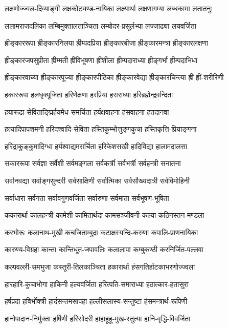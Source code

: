 \twolineshloka
{लक्षणोज्ज्वल-दिव्याङ्गी लक्षकोट्यण्ड-नायिका}
{लक्ष्यार्था लक्षणागम्या लब्धकामा लतातनुः}

\twolineshloka
{ललामराजदलिका लम्बिमुक्तालताञ्चिता}
{लम्बोदर-प्रसूर्लभ्या लज्जाढ्या लयवर्जिता}

\twolineshloka
{ह्रीङ्काररूपा ह्रीङ्कारनिलया ह्रीम्पदप्रिया}
{ह्रीङ्कारबीजा ह्रीङ्कारमन्त्रा ह्रीङ्कारलक्षणा}

\twolineshloka
{ह्रीङ्कारजपसुप्रीता ह्रीम्मती ह्रींविभूषणा}
{ह्रींशीला ह्रीम्पदाराध्या ह्रीङ्गर्भा ह्रीम्पदाभिधा}

\twolineshloka
{ह्रीङ्कारवाच्या ह्रीङ्कारपूज्या ह्रीङ्कारपीठिका}
{ह्रीङ्कारवेद्या ह्रीङ्कारचिन्त्या ह्रीं ह्रीं-शरीरिणी}

\twolineshloka
{हकाररूपा हलधृक्पूजिता हरिणेक्षणा}
{हरप्रिया हराराध्या हरिब्रह्मेन्द्रवन्दिता}

\twolineshloka
{हयारूढा-सेविताङ्घ्रिर्हयमेध-समर्चिता}
{हर्यक्षवाहना हंसवाहना हतदानवा}

\twolineshloka
{हत्यादिपापशमनी हरिदश्वादि-सेविता}
{हस्तिकुम्भोत्तुङ्गकुचा हस्तिकृत्ति-प्रियाङ्गना}

\twolineshloka
{हरिद्राकुङ्कुमादिग्धा हर्यश्वाद्यमरार्चिता}
{हरिकेशसखी हादिविद्या हालामदालसा}

\twolineshloka
{सकाररूपा सर्वज्ञा सर्वेशी सर्वमङ्गला}
{सर्वकर्त्री सर्वभर्त्री सर्वहन्त्री सनातना}

\twolineshloka
{सर्वानवद्या सर्वाङ्गसुन्दरी सर्वसाक्षिणी}
{सर्वात्मिका सर्वसौख्यदात्री सर्वविमोहिनी}

\twolineshloka
{सर्वाधारा सर्वगता सर्वावगुणवर्जिता}
{सर्वारुणा सर्वमाता सर्वभूषण-भूषिता}

\twolineshloka
{ककारार्था कालहन्त्री कामेशी कामितार्थदा}
{कामसञ्जीवनी कल्या कठिनस्तन-मण्डला}

\twolineshloka
{करभोरूः कलानाथ-मुखी कचजिताम्बुदा}
{कटाक्षस्यन्दि-करुणा कपालि-प्राणनायिका}

\twolineshloka
{कारुण्य-विग्रहा कान्ता कान्तिधूत-जपावलिः}
{कलालापा कम्बुकण्ठी करनिर्जित-पल्लवा}

\twolineshloka
{कल्पवल्ली-समभुजा कस्तूरी-तिलकाञ्चिता}
{हकारार्था हंसगतिर्हाटकाभरणोज्ज्वला}

\twolineshloka
{हारहारि-कुचाभोगा हाकिनी हल्यवर्जिता}
{हरित्पति-समाराध्या हठात्कार-हतासुरा}

\twolineshloka
{हर्षप्रदा हविर्भोक्त्री हार्दसन्तमसापहा}
{हल्लीसलास्य-सन्तुष्टा हंसमन्त्रार्थ-रूपिणी}

\twolineshloka
{हानोपादान-निर्मुक्ता हर्षिणी हरिसोदरी}
{हाहाहूहू-मुख-स्तुत्या हानि-वृद्धि-विवर्जिता}

